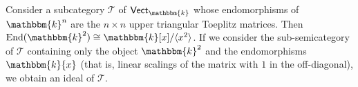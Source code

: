 
\noindent\begin{example} Consider a subcategory $\mathcal{T}$ of $\textsf{Vect}_\mathbbm{k}$ whose endomorphisms of $\mathbbm{k}^n$ are the $n\times n$ upper triangular Toeplitz matrices. Then $\End(\mathbbm{k}^2) \cong \mathbbm{k}[x]/\langle x^2\rangle$. If we consider the sub-semicategory of $\mathcal{T}$ containing only the object $\mathbbm{k}^2$ and the endomorphisms $\mathbbm{k}\{x\}$ (that is, linear scalings of the matrix with $1$ in the off-diagonal), we obtain an ideal of $\mathcal{T}$.\\%
\end{example}


